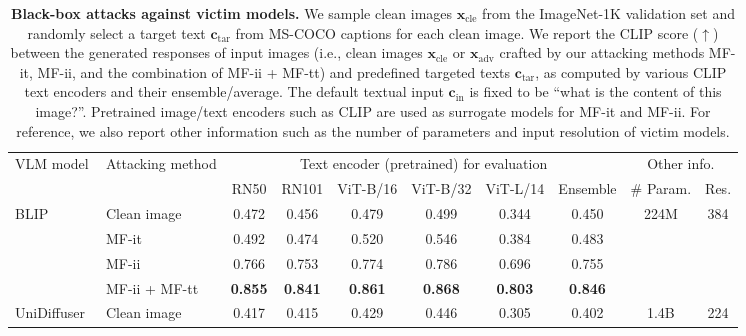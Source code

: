 \setlength{\tabcolsep}{1 mm}
\renewcommand{\arraystretch}{1.25}
\begin{table}[t]
\vspace{-0.cm}
    \centering
    \caption{
    \textbf{Black-box attacks against victim models.} We sample clean images $\boldsymbol{x}_\text{cle}$ from the ImageNet-1K validation set and randomly select a target text $\boldsymbol{c}_\text{tar}$ from MS-COCO captions for each clean image. We report the CLIP score ($\uparrow$) between the generated responses of input images (i.e., clean images $\boldsymbol{x}_\text{cle}$ or $\boldsymbol{x}_\text{adv}$ crafted by our attacking methods MF-it, MF-ii, and the combination of MF-ii + MF-tt) and predefined targeted texts $\boldsymbol{c}_\text{tar}$, as computed by various CLIP text encoders and their ensemble/average. 
    The default textual input $\boldsymbol{c}_\text{in}$ is fixed to be ``what is the content of this image?''. 
    Pretrained image/text encoders such as CLIP are used as surrogate models for MF-it and MF-ii. For reference, we also report other information such as the number of parameters and input resolution of victim models.
    }
    \vspace{0.1cm}
    \begin{adjustbox}{width=\textwidth}
    \begin{tabular}{ ll | cccccc | cc }
    \toprule[1.5pt]
         \multirow{2}{*}{VLM model} & \multirow{2}{*}{Attacking method} & \multicolumn{6}{c|}{Text encoder (pretrained) for evaluation} & \multicolumn{2}{c}{Other info.} \\
         & & RN50 & RN101 & ViT-B/16 & ViT-B/32 & ViT-L/14 & Ensemble & {\small \#} Param. & Res. \\ 
         \hline
         \multirow{4}{*}{BLIP~\citep{li2022blip}}
         & {Clean image} & 0.472 & 0.456 & 0.479 & 0.499 & 0.344 & 0.450 & \multirow{4}{*}{224M} & \multirow{4}{*}{384} \\
         & {MF-it} & 0.492 & 0.474 & 0.520 & 0.546 & 0.384 & 0.483
         \\
         & {MF-ii} & 0.766 & 0.753 & 0.774 & 0.786 & 0.696 & 0.755 & & \\
         & {MF-ii + MF-tt} & \textbf{0.855} & \textbf{0.841} & \textbf{0.861} & \textbf{0.868} & \textbf{0.803} & \textbf{0.846} \\
         \midrule
         \multirow{4}{*}{UniDiffuser~\citep{bao2022one}}
         & {Clean image} & 0.417 & 0.415 & 0.429 & 0.446 & 0.305 & 0.402 & \multirow{4}{*}{1.4B} & \multirow{4}{*}{224} \\

\end{tabular}
\end{adjustbox}
\end{table}
